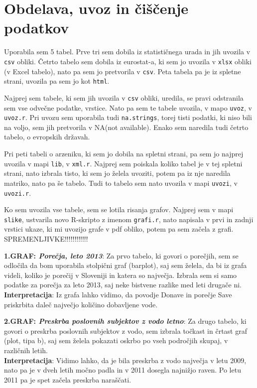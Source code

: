 \documentclass[11pt,a4paper]{article}
\begin{document}
\newpage
\section{Obdelava, uvoz in čiščenje podatkov}

Uporabila sem 5 tabel.
Prve tri sem dobila iz statističnega urada in jih uvozila v \verb|csv| obliki.
Četrto tabelo sem dobila iz eurostat-a, ki sem jo uvozila v \verb|xlsx| obliki (v Excel tabelo), nato pa sem jo pretvorila v \verb|csv|. Peta tabela pa je iz spletne strani, uvozila pa sem jo kot \verb|html|.

Najprej sem tabele, ki sem jih uvozila v \verb|csv| obliki, uredila, se pravi odstranila sem vse odvečne podatke, vrstice. Nato pa sem te tabele uvozila, v mapo \verb|uvoz|, v \verb|uvoz.r|. Pri uvozu sem uporabila tudi \verb|na.strings|, torej tisti podatki, ki niso bili na voljo, sem jih pretvorila v NA(not available). Enako sem naredila tudi četrto tabelo, o evropskih državah.

Pri peti tabeli o arzeniku, ki sem jo dobila na spletni strani, pa sem jo najprej uvozila v mapi \verb|lib|, v \verb|xml.r|. Najprej sem poiskala koliko tabel je v tej spletni strani, nato izbrala tisto, ki sem jo želela uvoziti, potem pa iz nje naredila matriko, nato pa še tabelo. Tudi to tabelo sem nato uvozila v mapi \verb|uvozi|, v \verb|uvozi.r|.

Ko sem uvozila vse tabele, sem se lotila risanja grafov. Najprej sem v mapi \verb|slike|, ustvarila novo R-skripto z imenom \verb|grafi.r|, nato napisala v prvi in zadnji vrstici ukaze, ki mi uvozijo grafe v pdf obliko, potem pa sem začela z grafi.\\

SPREMENLJIVKE!!!!!!!!!!!!

\newpage

\textbf{1.GRAF: \emph{Porečja, leto 2013}}: Za prvo tabelo, ki govori o porečjih, sem se odločila da bom uporabila stolpični graf (barplot), saj sem želela, da bi iz grafa videli, koliko je porečij v Sloveniji in katera so največja. Izbrala sem si samo podatke za porečja za leto 2013, saj neke bistvene razlike med leti drugače ni.\\
\textbf{Interpretacija}: Iz grafa lahko vidimo, da povodje Donave in porečje Save priskrbita daleč največjo količino dobavljene vode.


\newpage
\textbf{2.GRAF: \emph{Preskrba poslovnih subjektov z vodo letno}}: Za drugo tabelo, ki govori o preskrba poslovnih subjektov z vodo, sem izbrala točkast in črtast graf (plot, tipa b), saj sem želela pokazati oskrbo po vseh področjih skupaj, v različnih letih.\\
\textbf{Interpretacija}: Vidimo lahko, da je bila preskrba z vodo največja v letu 2009, nato pa je v dveh letih močno padla in v 2011 dosegla najnižjo raven. Po letu 2011 pa je spet začela preskrba naraščati.\\
\end{document}
